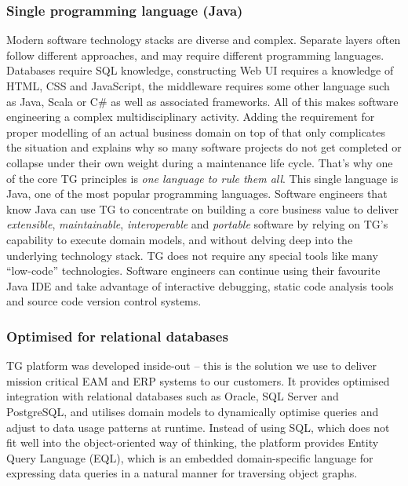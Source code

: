 \documentclass[a4paper,10pt,twocolumn,oneside,openright,final]{memoir}
\begin{document}
\subsubsection*{Single programming language (Java)}
	Modern software technology stacks are diverse and complex.
	Separate layers often follow different approaches, and may require different programming languages.
	Databases require SQL knowledge, constructing Web UI requires a knowledge of HTML, CSS and JavaScript, the middleware requires some other language such as Java, Scala or C\# as well as associated frameworks.
	All of this makes software engineering a complex multidisciplinary activity.
	Adding the requirement for proper modelling of an actual business domain on top of that only complicates the situation and explains why so many software projects do not get completed or collapse under their own weight during a maintenance life cycle.
	That's why one of the core TG principles is \emph{one language to rule them all}.
	This single language is Java, one of the most popular programming languages.
	Software engineers that know Java can use TG to concentrate on building a core business value to deliver \emph{extensible}, \emph{maintainable}, \emph{interoperable} and \emph{portable} software by relying on TG's capability to execute domain models, and without delving deep into the underlying technology stack.
	TG does not require any special tools like many ``low-code'' technologies.
	Software engineers can continue using their favourite Java IDE and take advantage of interactive debugging, static code analysis tools and source code version control systems.

\subsubsection*{Optimised for relational databases}
	TG platform was developed inside-out -- this is the solution we use to deliver mission critical EAM and ERP systems to our customers.
	It provides optimised integration with relational databases such as Oracle, SQL Server and PostgreSQL, and utilises domain models to dynamically optimise queries and adjust to data usage patterns at runtime.
	Instead of using SQL, which does not fit well into the object-oriented way of thinking, the platform provides Entity Query Language (EQL), which is an embedded domain-specific language for expressing data queries in a natural manner for traversing object graphs.
\end{document}
